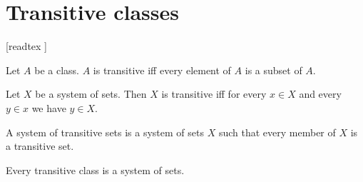 \documentclass[../../set-theory/set-theory.tex]{subfiles}
\begin{document}
  \chapter{Transitive classes}\label{chapter:transitive-classes}


  \begin{forthel}

    [readtex ]

  \end{forthel}


  \begin{forthel}
    \begin{definition}
      Let $A$ be a class.
      $A$ is transitive iff every element of $A$ is a subset of $A$.
    \end{definition}
  \end{forthel}

  \begin{forthel}
    \begin{proposition}
      Let $X$ be a system of sets.
      Then $X$ is transitive iff for every $x \in X$ and every $y \in x$ we
      have $y \in X$.
    \end{proposition}
  \end{forthel}

  \begin{forthel}
    \begin{definition}
      A system of transitive sets is a system of sets $X$ such that every member
      of $X$ is a transitive set.
    \end{definition}
  \end{forthel}

  \begin{forthel}
    \begin{proposition}
      Every transitive class is a system of sets.
    \end{proposition}
  \end{forthel}
\end{document}
